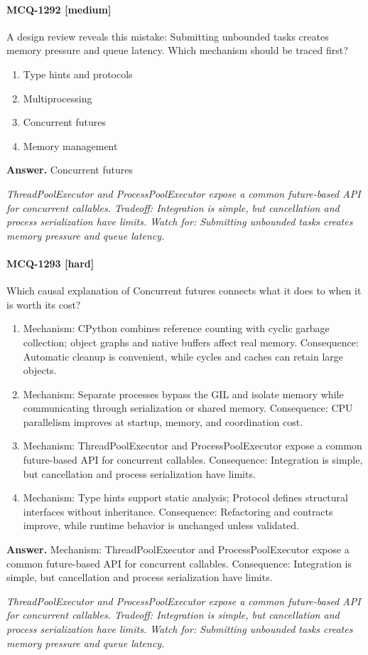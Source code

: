 \paragraph{MCQ-1292 [medium]} A design review reveals this mistake: Submitting unbounded tasks creates memory pressure and queue latency. Which mechanism should be traced first?
\begin{enumerate}[label=\Alph*.]
\item Type hints and protocols
\item Multiprocessing
\item Concurrent futures
\item Memory management
\end{enumerate}
\noindent\textbf{Answer.} Concurrent futures
\par\textit{ThreadPoolExecutor and ProcessPoolExecutor expose a common future-based API for concurrent callables. Tradeoff: Integration is simple, but cancellation and process serialization have limits. Watch for: Submitting unbounded tasks creates memory pressure and queue latency.}
\paragraph{MCQ-1293 [hard]} Which causal explanation of Concurrent futures connects what it does to when it is worth its cost?
\begin{enumerate}[label=\Alph*.]
\item Mechanism: CPython combines reference counting with cyclic garbage collection; object graphs and native buffers affect real memory. Consequence: Automatic cleanup is convenient, while cycles and caches can retain large objects.
\item Mechanism: Separate processes bypass the GIL and isolate memory while communicating through serialization or shared memory. Consequence: CPU parallelism improves at startup, memory, and coordination cost.
\item Mechanism: ThreadPoolExecutor and ProcessPoolExecutor expose a common future-based API for concurrent callables. Consequence: Integration is simple, but cancellation and process serialization have limits.
\item Mechanism: Type hints support static analysis; Protocol defines structural interfaces without inheritance. Consequence: Refactoring and contracts improve, while runtime behavior is unchanged unless validated.
\end{enumerate}
\noindent\textbf{Answer.} Mechanism: ThreadPoolExecutor and ProcessPoolExecutor expose a common future-based API for concurrent callables. Consequence: Integration is simple, but cancellation and process serialization have limits.
\par\textit{ThreadPoolExecutor and ProcessPoolExecutor expose a common future-based API for concurrent callables. Tradeoff: Integration is simple, but cancellation and process serialization have limits. Watch for: Submitting unbounded tasks creates memory pressure and queue latency.}

